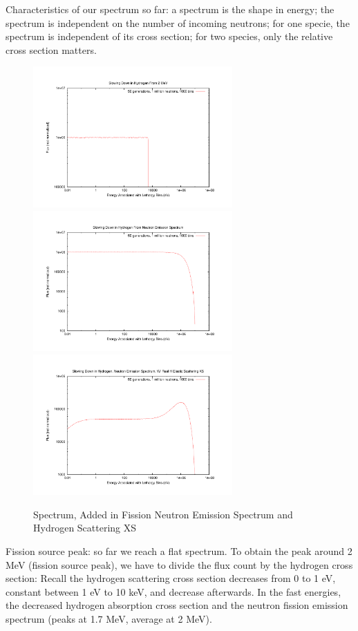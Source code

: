 \documentclass{school-22.211-notes}
\begin{document}
Characteristics of our spectrum so far: a spectrum is the shape in energy; the spectrum is independent on the number of incoming neutrons; for one specie, the spectrum is independent of its cross section; for two species, only the relative cross section matters. 
\begin{figure}[ht]
  \centering
  \includegraphics[width=3in]{images/sl-d/spec-1.uncrop.pdf}
  \includegraphics[width=3in]{images/sl-d/spec-2.uncrop.pdf}
  \includegraphics[width=3in]{images/sl-d/spec-3.uncrop.pdf}
  \caption{Spectrum, Added in Fission Neutron Emission Spectrum and Hydrogen Scattering XS} \label{spe1}
\end{figure}

Fission source peak: so far we reach a flat spectrum. To obtain the peak around 2 MeV (fission source peak), we have to divide the flux count by the hydrogen cross section:
Recall the hydrogen scattering cross section decreases from 0 to 1 eV, constant between 1 eV to 10 keV, and decrease afterwards. In the fast energies, the decreased hydrogen absorption cross section and the neutron fission emission spectrum (peaks at 1.7 MeV, average at 2 MeV). 
\end{document}
